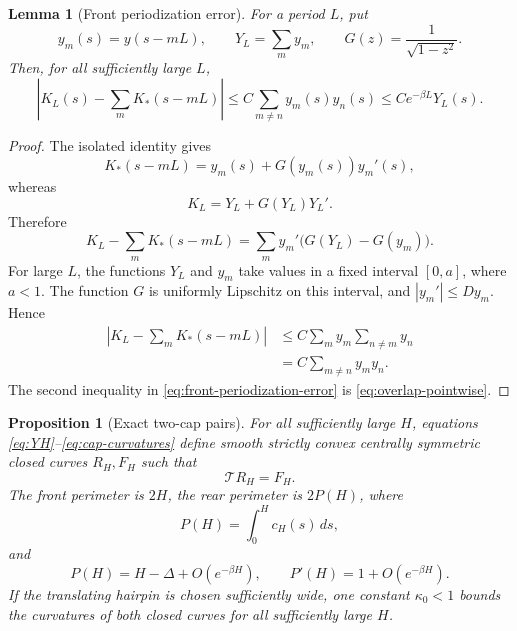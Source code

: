 \documentclass[11pt]{article}
\newtheorem{proposition}[theorem]{Proposition}
\newtheorem{lemma}[theorem]{Lemma}
\theoremstyle{remark}
\newcommand{\Tmap}{\mathcal T}
\begin{document}
\begin{lemma}[Front periodization error]\label{lem:front-periodization-error}
For a period \(L\), put
\[
   y_m(s)=y(s-mL),
   \qquad
   Y_L=\sum_m y_m,
   \qquad
   G(z)=\frac1{\sqrt{1-z^2}}.
\]
Then, for all sufficiently large \(L\),
\begin{equation}\label{eq:front-periodization-error}
 \left|K_L(s)-\sum_mK_*(s-mL)\right|
 \leq C\sum_{m\ne n}y_m(s)y_n(s)
 \leq Ce^{-\beta L}Y_L(s).
\end{equation}
\end{lemma}

\begin{proof}
The isolated identity gives
\[
   K_*(s-mL)=y_m(s)+G(y_m(s))y_m'(s),
\]
whereas
\[
   K_L=Y_L+G(Y_L)Y_L'.
\]
Therefore
\[
 K_L-\sum_mK_*(s-mL)
   =\sum_m y_m'\bigl(G(Y_L)-G(y_m)\bigr).
\]
For large \(L\), the functions \(Y_L\) and \(y_m\) take values in a
fixed interval \([0,a]\), where \(a<1\).  The function \(G\) is
uniformly Lipschitz on this interval, and \(|y_m'|\leq Dy_m\).  Hence
\[
\begin{aligned}
 \left|K_L-\sum_mK_*(s-mL)\right|
 &\leq C\sum_m y_m\sum_{n\ne m}y_n\\
 &=C\sum_{m\ne n}y_my_n.
\end{aligned}
\]
The second inequality in \eqref{eq:front-periodization-error} is
\eqref{eq:overlap-pointwise}.
\end{proof}

\begin{proposition}[Exact two-cap pairs]\label{prop:pairs}
For all sufficiently large \(H\), equations
\eqref{eq:YH}--\eqref{eq:cap-curvatures} define smooth strictly convex
centrally symmetric closed curves \(R_H,F_H\) such that
\[
   \Tmap R_H=F_H.
\]
The front perimeter is \(2H\), the rear perimeter is \(2P(H)\), where
\begin{equation}\label{eq:PH}
   P(H)=\int_0^Hc_H(s)\,ds,
\end{equation}
and
\begin{equation}\label{eq:P-asymptotic}
   P(H)=H-\Delta+O(e^{-\beta H}),
   \qquad
   P'(H)=1+O(e^{-\beta H}).
\end{equation}
If the translating hairpin is chosen sufficiently wide, one constant
\(\kappa_0<1\) bounds the curvatures of both closed curves for all
sufficiently large \(H\).
\end{proposition}
\end{document}
